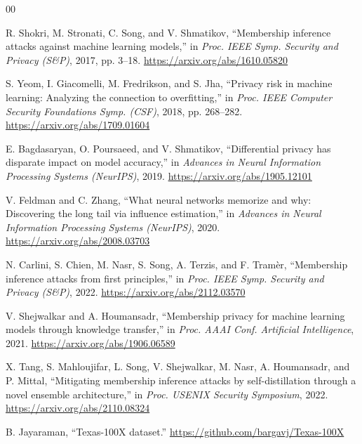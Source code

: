 \documentclass[conference]{IEEEtran}
\begin{document}
\begin{thebibliography}{00}

 R. Shokri, M. Stronati, C. Song, and V. Shmatikov, ``Membership inference attacks against machine learning models,'' in \emph{Proc. IEEE Symp. Security and Privacy (S\&P)}, 2017, pp. 3--18. \url{https://arxiv.org/abs/1610.05820}

 S. Yeom, I. Giacomelli, M. Fredrikson, and S. Jha, ``Privacy risk in machine learning: Analyzing the connection to overfitting,'' in \emph{Proc. IEEE Computer Security Foundations Symp. (CSF)}, 2018, pp. 268--282. \url{https://arxiv.org/abs/1709.01604}

 E. Bagdasaryan, O. Poursaeed, and V. Shmatikov, ``Differential privacy has disparate impact on model accuracy,'' in \emph{Advances in Neural Information Processing Systems (NeurIPS)}, 2019. \url{https://arxiv.org/abs/1905.12101}

 V. Feldman and C. Zhang, ``What neural networks memorize and why: Discovering the long tail via influence estimation,'' in \emph{Advances in Neural Information Processing Systems (NeurIPS)}, 2020. \url{https://arxiv.org/abs/2008.03703}

 N. Carlini, S. Chien, M. Nasr, S. Song, A. Terzis, and F. Tram\`er, ``Membership inference attacks from first principles,'' in \emph{Proc. IEEE Symp. Security and Privacy (S\&P)}, 2022. \url{https://arxiv.org/abs/2112.03570}

 V. Shejwalkar and A. Houmansadr, ``Membership privacy for machine learning models through knowledge transfer,'' in \emph{Proc. AAAI Conf. Artificial Intelligence}, 2021. \url{https://arxiv.org/abs/1906.06589}

 X. Tang, S. Mahloujifar, L. Song, V. Shejwalkar, M. Nasr, A. Houmansadr, and P. Mittal, ``Mitigating membership inference attacks by self-distillation through a novel ensemble architecture,'' in \emph{Proc. USENIX Security Symposium}, 2022. \url{https://arxiv.org/abs/2110.08324}

 B. Jayaraman, ``Texas-100X dataset.'' \url{https://github.com/bargavj/Texas-100X}

\end{thebibliography}
\end{document}
